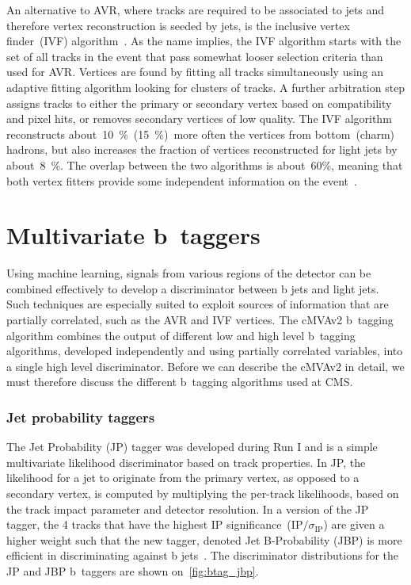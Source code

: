 An alternative to AVR, where tracks are required to be associated to jets and therefore vertex reconstruction is seeded by jets, is the inclusive vertex finder~(IVF) algorithm~\cite{Khachatryan:2011wq}. As the name implies, the IVF algorithm starts with the set of all tracks in the event that pass somewhat looser selection criteria than used for AVR. Vertices are found by fitting all tracks simultaneously using an adaptive fitting algorithm looking for clusters of tracks. A further arbitration step assigns tracks to either the primary or secondary vertex based on compatibility and pixel hits, or removes secondary vertices of low quality. The IVF algorithm reconstructs about~10~\%~(15~\%)~more often the vertices from bottom~(charm) hadrons, but also increases the fraction of vertices reconstructed for light jets by about~8~\%. The overlap between the two algorithms is about~60\%, meaning that both vertex fitters provide some independent information on the event~\cite{CMS-PAS-BTV-15-001}.

\section{Multivariate b~taggers}
Using machine learning, signals from various regions of the detector can be combined effectively to develop a discriminator between b jets and light jets. Such techniques are especially suited to exploit sources of information that are partially correlated, such as the AVR and IVF vertices. The cMVAv2 b~tagging algorithm combines the output of different low and high level b~tagging algorithms, developed independently and using partially correlated variables, into a single high level discriminator. Before we can describe the cMVAv2 in detail, we must therefore discuss the different b~tagging algorithms used at CMS.

\subsubsection{Jet probability taggers}
The Jet Probability (JP) tagger was developed during Run I and is a simple multivariate likelihood discriminator based on track properties. In JP, the likelihood for a jet to originate from the primary vertex, as opposed to a secondary vertex, is computed by multiplying the per-track likelihoods, based on the track impact parameter and detector resolution. In a version of the JP tagger, the 4 tracks that have the highest IP significance~($\mathrm{IP} / \sigma_{\mathrm{IP}}$) are given a higher weight such that the new tagger, denoted Jet B-Probability (JBP) is more efficient in discriminating against b jets~\cite{Chatrchyan:2012jua}. The discriminator distributions for the JP and JBP b~taggers are shown on~\cref{fig:btag_jbp}.


